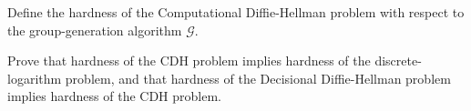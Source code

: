 \documentclass[a4paper,10pt,landscape,twocolumn]{scrartcl}
\begin{document}

\begin{exercise}
\begin{subex}
Define the hardness of the Computational Diffie-Hellman problem with respect to the group-generation algorithm $\mathcal{G}$. %
\end{subex}
\begin{subex}
Prove that hardness of the CDH problem implies hardness of the discrete-logarithm problem, and that hardness of the Decisional Diffie-Hellman problem implies hardness of the CDH problem.
\end{subex}
\end{exercise}
\end{document}
